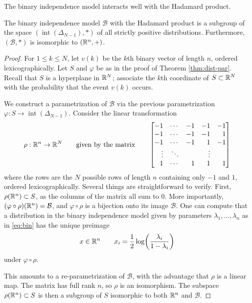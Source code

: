 \documentclass[cclicense]{hmcthesis}
\newcommand*{\Bin}{\mathcal{B}}
\DeclareMathOperator{\intr}{int}
\numberwithin{equation}{section}
\begin{document}
    The binary independence model interacts well with the Hadamard product.
    \begin{theorem}\label{thm:bin-par}
    The binary independence model $\Bin$ with the Hadamard product is a subgroup
    of the space $(\intr(\Delta_{N-1}), *)$ of all strictly positive
    distributions.  Furthermore, $(\Bin, *)$ is  isomorphic to $(\mathbb{R}^n, +)$.
    \end{theorem}
    \begin{proof}
    For $1 \le k \le N$, let $v(k)$ be the $k$th binary vector of length $n$,
    ordered lexicographically.  Let $S$ and $\varphi$ be as in the proof of
    Theorem \ref{thm:dist-par}.  Recall that $S$ is a hyperplane in $\mathbb{R}^N$;
    associate the $k$th coordinate of $S \subset \mathbb{R}^N$ with the probability that
    the event $v(k)$ occurs.  
    
    We construct a parametrization of $\Bin$ via the previous parametrization
    $\varphi : S \to \intr(\Delta_{N-1})$. Consider the linear transformation 
    \[
        \rho: \R^n \to \R^N
        \qquad\text{given by the matrix}\qquad
        \begin{bmatrix*}[r]
            -1 & \cdots & -1 & -1 & -1 \\
            -1 & \cdots & -1 & -1 &  1 \\
            -1 & \cdots & -1 &  1 & -1 \\
            \vdots & \ddots &  & \vdots &  \\
             1 & \cdots &  1 &  1 &  1
        \end{bmatrix*}
    \]
    where the rows are the $N$ possible rows of length $n$ containing only $-1$
    and $1$, ordered lexicographically.  Several things are straightforward to
    verify.  First, $\rho(\mathbb{R}^n) \subset S$, as the columns of the matrix all sum
    to 0.  More importantly, $(\varphi \circ \rho)(\R^n) = \Bin$, and $\varphi
    \circ \rho$ is a bijection onto its image $\Bin$.  One can compute that a
    distribution in the binary independence model given by parameters
    $\lambda_1, \ldots, \lambda_n$ as in \eqref{eq:bin} has the unique preimage
    \[
        x \in \R^n
        \qquad
        x_i = \frac 1 2 \log \pdel*{\frac{\lambda_i}{1 - \lambda_i}}
    \]
    under $\varphi \circ \rho$.  
    
    This amounts to a re-parametrization of $\Bin$, with the advantage that
    $\rho$ is a linear map.  The matrix has full rank $n$, so $\rho$ is an
    isomorphism.  The subspace $\rho(\mathbb{R}^n) \subset S$ is then a subgroup of $S$
    isomorphic to both $\mathbb{R}^n$ and $\Bin$.
    \end{proof}
\end{document}

